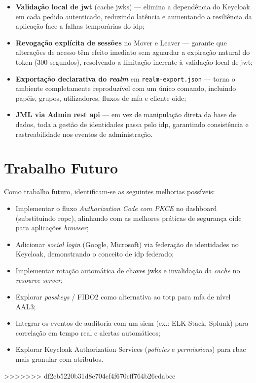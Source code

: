 \begin{itemize}
  \item \textbf{Validação local de \gls{jwt}} (cache \gls{jwks}) — elimina a dependência do Keycloak em cada pedido autenticado, reduzindo latência e aumentando a resiliência da aplicação face a falhas temporárias do \gls{idp};

  \item \textbf{Revogação explícita de sessões} no Mover e Leaver — garante que alterações de acesso têm efeito imediato sem aguardar a expiração natural do token (300 segundos), resolvendo a limitação inerente à validação local de \gls{jwt};

  \item \textbf{Exportação declarativa do \textit{realm}} em \texttt{realm-export.json} — torna o ambiente completamente reproduzível com um único comando, incluindo papéis, grupos, utilizadores, fluxos de \gls{mfa} e cliente \gls{oidc};

  \item \textbf{JML via Admin \gls{rest} \gls{api}} — em vez de manipulação direta da base de dados, toda a gestão de identidades passa pelo \gls{idp}, garantindo consistência e rastreabilidade nos eventos de administração.
\end{itemize}

\section{Trabalho Futuro}

Como trabalho futuro, identificam-se as seguintes melhorias possíveis:

\begin{itemize}
  \item Implementar o fluxo \textit{Authorization Code com PKCE} no dashboard (substituindo \gls{ropc}), alinhando com as melhores práticas de segurança \gls{oidc} para aplicações \textit{browser};
  \item Adicionar \textit{social login} (Google, Microsoft) via federação de identidades no Keycloak, demonstrando o conceito de \gls{idp} federado;
  \item Implementar rotação automática de chaves \gls{jwks} e invalidação da \textit{cache} no \textit{resource server};
  \item Explorar \textit{passkeys} / FIDO2 como alternativa ao \gls{totp} para \gls{mfa} de nível AAL3;
  \item Integrar os eventos de auditoria com um \gls{siem} (ex.: ELK Stack, Splunk) para correlação em tempo real e alertas automáticos;
  \item Explorar Keycloak Authorization Services (\textit{policies} e \textit{permissions}) para \gls{rbac} mais granular com atributos.
\end{itemize}
>>>>>>> df2eb5220b31d8e704cf4f670cff764b26edabce
